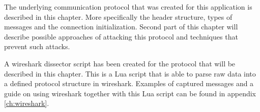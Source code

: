The underlying communication protocol that was created for this application is described in this chapter. More specifically the header structure, types of messages and the connection initialization. Second part of this chapter will describe possible approaches of attacking this protocol and techniques that prevent such attacks.

A wireshark dissector script has been created for the protocol that will be described in this chapter. This is a Lua script that is able to parse raw data into a defined protocol structure in wireshark. Examples of captured messages and a guide on using wireshark together with this Lua script can be found in appendix \ref{ch:wireshark}.
